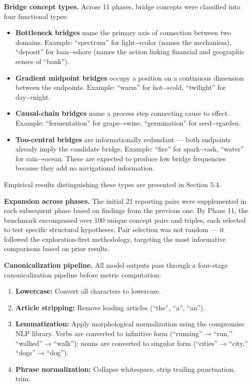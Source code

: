 \textbf{Bridge concept types.} Across 11 phases, bridge concepts were classified into four functional types:

\begin{itemize}
\tightlist
\item
  \textbf{Bottleneck bridges} name the primary axis of connection between two domains. Example: ``spectrum'' for light→color (names the mechanism), ``deposit'' for loan→shore (names the action linking financial and geographic senses of ``bank'').
\item
  \textbf{Gradient midpoint bridges} occupy a position on a continuous dimension between the endpoints. Example: ``warm'' for hot→cold, ``twilight'' for day→night.
\item
  \textbf{Causal-chain bridges} name a process step connecting cause to effect. Example: ``fermentation'' for grape→wine, ``germination'' for seed→garden.
\item
  \textbf{Too-central bridges} are informationally redundant --- both endpoints already imply the candidate bridge. Example: ``fire'' for spark→ash, ``water'' for rain→ocean. These are expected to produce low bridge frequencies because they add no navigational information.
\end{itemize}

Empirical results distinguishing these types are presented in Section 5.4.

\textbf{Expansion across phases.} The initial 21 reporting pairs were supplemented in each subsequent phase based on findings from the previous one. By Phase 11, the benchmark encompassed over 100 unique concept pairs and triples, each selected to test specific structural hypotheses. Pair selection was not random --- it followed the exploration-first methodology, targeting the most informative comparisons based on prior results.

\textbf{Canonicalization pipeline.} All model outputs pass through a four-stage canonicalization pipeline before metric computation:

\begin{enumerate}
\def\labelenumi{\arabic{enumi}.}
\tightlist
\item
  \textbf{Lowercase:} Convert all characters to lowercase.
\item
  \textbf{Article stripping:} Remove leading articles (``the'', ``a'', ``an'').
\item
  \textbf{Lemmatization:} Apply morphological normalization using the compromise NLP library. Verbs are converted to infinitive form (``running'' → ``run,'' ``walked'' → ``walk''); nouns are converted to singular form (``cities'' → ``city,'' ``dogs'' → ``dog'').
\item
  \textbf{Phrase normalization:} Collapse whitespace, strip trailing punctuation, trim.
\end{enumerate}

